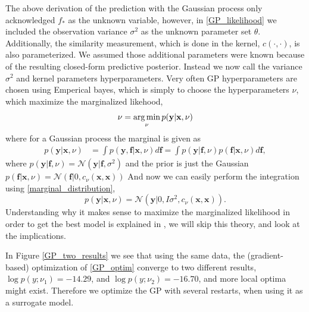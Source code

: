 The above derivation of the prediction with the Gaussian process only acknowledged $f_*$ as the unknown
variable, however, in \eqref{GP_likelihood} we included the observation variance $\sigma^2$
as the unknown parameter set $\theta$. Additionally, the similarity measurement, which is done in the kernel, 
 $c(\cdot , \cdot )$, is also parameterized. We assumed those additional parameters were known because
of the resulting closed-form predictive posterior. Instead we now call the variance $\sigma^2$ and
kernel parameters hyperparameters. Very often GP hyperparameters are chosen using Emperical bayes, which is simply
to choose the hyperparameters $\nu$, which maximize the marginalized likehood,  
\begin{equation}\label{GP_optim}
    \nu = \operatorname*{arg\,min}_{\nu} p(\textbf{y}|\textbf{x}, \nu)
\end{equation}
where for a Gaussian process the marginal is given as 
\begin{align*}
    p(\textbf{y}|\textbf{x}, \nu) &= \int  p(\textbf{y}, \textbf{f}|\textbf{x}, \nu) d\textbf{f} = \int p(\textbf{y}|\textbf{f},\nu)p(\textbf{f}|\textbf{x},\nu) d\textbf{f},
\end{align*}
where  $p(\textbf{y}|\textbf{f},\nu) = \mathcal{N}(\textbf{y}|\textbf{f},\sigma^2)$ and the prior is
just the Gaussian $p(\textbf{f}|\textbf{x},\nu) = \mathcal{N}(\textbf{f}|0, c_{\nu}(\textbf{x}, \textbf{x}))$
And now we can easily perform the integration using \eqref{marginal_distribution}, 
$$p(\textbf{y}|\textbf{x}, \nu) = \mathcal{N}(\textbf{y}|0,I\sigma^2, c_{\nu}(\textbf{x}, \textbf{x})).$$
Understanding why it makes sense to maximize the marginalized likelihood in order to get the best model
is explained in \cite[165]{bishop}, we will skip this theory, and look at the implications. 

In Figure \ref{GP_two_results} we see that using the same data, the (gradient-based) optimization of \eqref{GP_optim} converge
to two different results, $\log p(y;\nu_1) = -14.29$, and $\log p(y;\nu_2) = -16.70$, and more local optima might exist. Therefore
we optimize the GP with several restarts, when using it as a surrogate model. 


